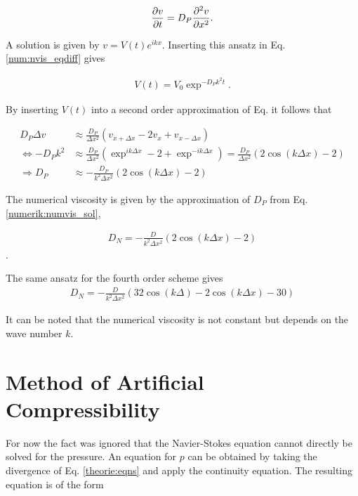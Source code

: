 \begin{align}
    \label{num:nvis_eqdiff}
    \pdn[v]{t} = D_P\pdn[^2v]{x^2}.
\end{align}

A solution is given by $v = V(t)e^{ikx}$. Inserting this ansatz in Eq. \ref{num:nvis_eqdiff} gives

\begin{align}
    V(t) = V_0 \exp^{-D_Pk^2t}.
\end{align}

By inserting $V(t)$ into a  second order approximation of Eq. \label{ref:nvis_eqdiff} it follows that

\begin{align}
                      D_P \Delta v  &\approx \frac{D_P}{\Delta x^2} \left(v_{x+\Delta x} - 2 v_x + v_{x - \Delta x}\right) \\
    \Leftrightarrow   -D_P k^2        &\approx \frac{D_P}{\Delta x^2} \left(\exp^{ik\Delta x} - 2 + \exp^{-ik\Delta x}\right) =   \frac{D_P}{\Delta x^2} \left(2\cos(k\Delta x) - 2\right)\\
    \Rightarrow   D_P      &\approx - \frac{D_P}{k^2 \Delta x^2} \left(2\cos(k\Delta x) - 2\right)
    \label{numerik:numvis_sol}
\end{align}

The numerical viscosity is given by the approximation of $D_P$  from Eq. \ref{numerik:numvis_sol},

\begin{align}
 \label{NUMERIC:NUMVIS}
    D_N = -\frac{D}{k^2 \Delta x^2} \left(2\cos(k\Delta x) - 2\right)
\end{align}.

The same ansatz for the fourth order scheme gives
\begin{align}
 \label{NUMERIC:NUMVIS2}
    D_N = -\frac{D}{k^2 \Delta x^2} \left(32\cos(k\Delta ) - 2\cos(k\Delta x) - 30\right)
\end{align}

It can be noted that the numerical viscosity is not constant but depends on the wave number $k$.
\clearpage


\section{Method of Artificial Compressibility}
\label{num:sec_articomp}

For now the fact was ignored that the Navier-Stokes equation cannot directly be solved for the pressure.
An equation for $p$ can be obtained by taking the divergence of Eq. \ref{theorie:eqns} and apply the continuity equation.
The resulting equation is of the form \citep{Lulff2011}

